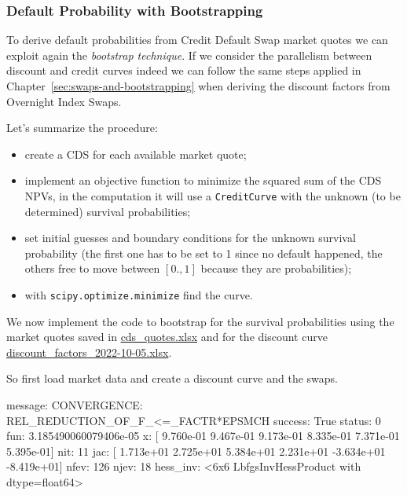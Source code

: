 \subsubsection*{Default Probability with Bootstrapping}
\label{default-probabilities-and-cds}

To derive default probabilities from Credit Default Swap market quotes we can exploit again the \emph{bootstrap technique}. If we consider the parallelism between discount and credit curves indeed we can follow the same steps applied in Chapter~\ref{sec:swaps-and-bootstrapping} when deriving the discount factors from Overnight Index Swaps.

Let's summarize the procedure: 
\begin{itemize}
\tightlist
\item create a CDS for each available market quote;
\item implement an objective function to minimize the squared sum of the CDS NPVs, in the computation it will use a \texttt{CreditCurve} with the unknown (to be determined) survival probabilities;
\item set initial guesses and boundary conditions for the unknown survival probability (the first one has to be set to 1 since no default happened, the others free to move between $[0., 1]$ because they are probabilities);
\item with \texttt{scipy.optimize.minimize} find the curve.
\end{itemize}

We now implement the code to bootstrap for the survival probabilities using the market quotes saved in \href{https://github.com/matteosan1/finance_course/raw/master/input_files/cds_quotes.xlsx}{cds\_quotes.xlsx} and for the discount curve \href{https://github.com/matteosan1/finance_course/raw/master/input_files/discount_factors_2022-10-05.xlsx}{discount\_factors\_2022-10-05.xlsx}.

So first load market data and create a discount curve and the swaps.


\begin{ioutput}
  message: CONVERGENCE: REL_REDUCTION_OF_F_<=_FACTR*EPSMCH
  success: True
   status: 0
      fun: 3.185490060079406e-05
        x: [ 9.760e-01  9.467e-01  9.173e-01  8.335e-01  7.371e-01
             5.395e-01]
      nit: 11
      jac: [ 1.713e+01  2.725e+01  5.384e+01  2.231e+01 -3.634e+01
            -8.419e+01]
     nfev: 126
     njev: 18
 hess_inv: <6x6 LbfgsInvHessProduct with dtype=float64>
\end{ioutput}

